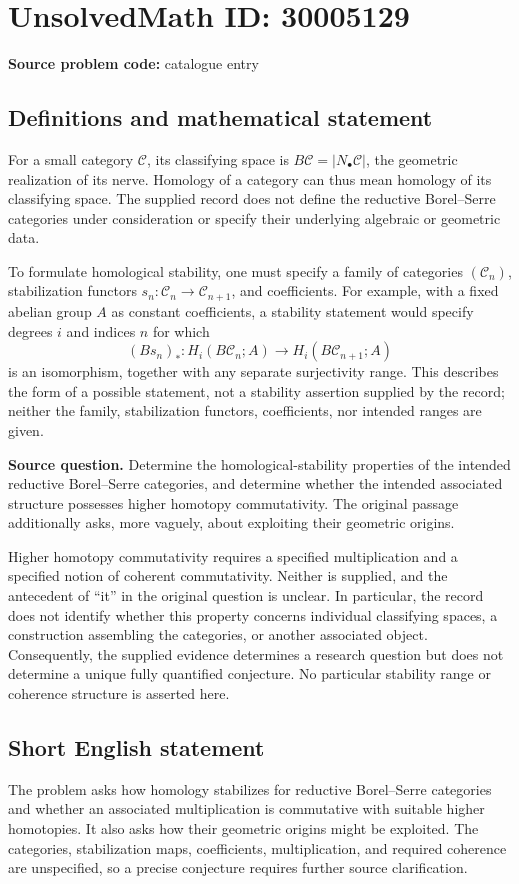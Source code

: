 \documentclass[11pt]{article}
\begin{document}
\section*{UnsolvedMath ID: 30005129}
\textbf{Source problem code:} catalogue entry
\subsection{Definitions and mathematical statement}
For a small category \(\mathcal C\), its classifying space is \(B\mathcal C=|N_\bullet\mathcal C|\), the geometric realization of its nerve. Homology of a category can thus mean homology of its classifying space. The supplied record does not define the reductive Borel--Serre categories under consideration or specify their underlying algebraic or geometric data.

To formulate homological stability, one must specify a family of categories \((\mathcal C_n)\), stabilization functors \(s_n:\mathcal C_n\to\mathcal C_{n+1}\), and coefficients. For example, with a fixed abelian group \(A\) as constant coefficients, a stability statement would specify degrees \(i\) and indices \(n\) for which
\[
(Bs_n)_*:H_i(B\mathcal C_n;A)\longrightarrow H_i(B\mathcal C_{n+1};A)
\]
is an isomorphism, together with any separate surjectivity range. This describes the form of a possible statement, not a stability assertion supplied by the record; neither the family, stabilization functors, coefficients, nor intended ranges are given.

\textbf{Source question.} Determine the homological-stability properties of the intended reductive Borel--Serre categories, and determine whether the intended associated structure possesses higher homotopy commutativity. The original passage additionally asks, more vaguely, about exploiting their geometric origins.

Higher homotopy commutativity requires a specified multiplication and a specified notion of coherent commutativity. Neither is supplied, and the antecedent of ``it'' in the original question is unclear. In particular, the record does not identify whether this property concerns individual classifying spaces, a construction assembling the categories, or another associated object. Consequently, the supplied evidence determines a research question but does not determine a unique fully quantified conjecture. No particular stability range or coherence structure is asserted here.
\subsection{Short English statement}
The problem asks how homology stabilizes for reductive Borel--Serre categories and whether an associated multiplication is commutative with suitable higher homotopies. It also asks how their geometric origins might be exploited. The categories, stabilization maps, coefficients, multiplication, and required coherence are unspecified, so a precise conjecture requires further source clarification.
\end{document}
